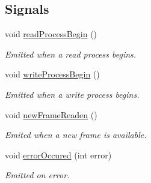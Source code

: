 \subsection*{Signals}
\begin{DoxyCompactItemize}
\item 
void \hyperlink{classmdt_port_thread_abb7234a12814f5c7c98bd6c1c2ccb776}{readProcessBegin} ()
\begin{DoxyCompactList}\small\item\em Emitted when a read process begins. \end{DoxyCompactList}\item 
void \hyperlink{classmdt_port_thread_aa01aac7e1a26deb823be40e6cb01b255}{writeProcessBegin} ()
\begin{DoxyCompactList}\small\item\em Emitted when a write process begins. \end{DoxyCompactList}\item 
void \hyperlink{classmdt_port_thread_a7fc2245c753fd65e1beffec211c41461}{newFrameReaden} ()
\begin{DoxyCompactList}\small\item\em Emited when a new frame is available. \end{DoxyCompactList}\item 
void \hyperlink{classmdt_port_thread_ab31cbe1a85aa830cd368654d1f806326}{errorOccured} (int error)
\begin{DoxyCompactList}\small\item\em Emitted on error. \end{DoxyCompactList}\end{DoxyCompactItemize}
